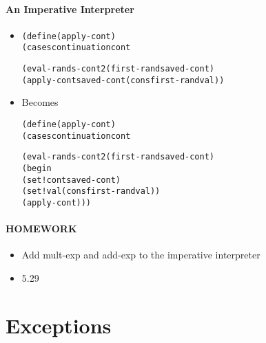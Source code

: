 \documentclass{beamer}
\begin{document}
\begin{frame}[fragile]
\framesubtitle{An Imperative Interpreter}
\begin{scriptsize}
\begin{itemize}
\item<1->
\begin{alltt}
(define (apply-cont)
  (cases continuation cont
    
    (eval-rands-cont2 (first-rand saved-cont)
      (apply-cont saved-cont (cons first-rand val))
\end{alltt}

\item<1-> Becomes
\begin{alltt}
(define (apply-cont)
  (cases continuation cont
    
    (eval-rands-cont2 (first-rand saved-cont)
                      (begin
                        (set! cont saved-cont)
                        (set! val (cons first-rand val))
                        (apply-cont)))
\end{alltt}

\end{itemize}
\end{scriptsize}
\end{frame}





\begin{frame}[fragile]
\framesubtitle{HOMEWORK}
\begin{scriptsize}
\begin{itemize}
\item<1-> Add mult-exp and add-exp  to the imperative interpreter

\item<1-> 5.29

\end{itemize}
\end{scriptsize}
\end{frame}


\section{Exceptions}
\end{document}
